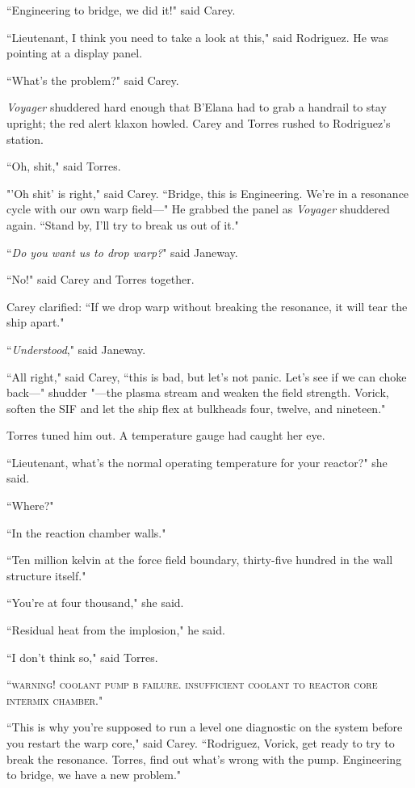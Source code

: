 \documentclass[twoside,letterpaper,12pt]{memoir}
\begin{document}
``Engineering to bridge, we did it!" said Carey.

``Lieutenant, I think you need to take a look at this," said Rodriguez. He was pointing at a display panel.

``What's the problem?" said Carey.

\textit{Voyager} shuddered hard enough that B'Elana had to grab a handrail to stay upright; the red alert klaxon howled. Carey and Torres rushed to Rodriguez's station.

``Oh, shit," said Torres.

"'Oh shit' is right," said Carey. ``Bridge, this is Engineering. We're in a resonance cycle with our own warp field---" He grabbed the panel as \textit{Voyager} shuddered again. ``Stand by, I'll try to break us out of it."

``\textit{Do you want us to drop warp?}" said Janeway.

``No!" said Carey and Torres together.

Carey clarified: ``If we drop warp without breaking the resonance, it will tear the ship apart."

``\textit{Understood}," said Janeway.

``All right," said Carey, ``this is bad, but let's not panic. Let's see if we can choke back---" shudder "---the plasma stream and weaken the field strength. Vorick, soften the SIF and let the ship flex at bulkheads four, twelve, and nineteen."

Torres tuned him out. A temperature gauge had caught her eye.

``Lieutenant, what's the normal operating temperature for your reactor?" she said.

``Where?"

``In the reaction chamber walls."

``Ten million kelvin at the force field boundary, thirty-five hundred in the wall structure itself."

``You're at four thousand," she said.

``Residual heat from the implosion," he said.

``I don't think so," said Torres.

``\textsc{warning! coolant pump b failure. insufficient coolant to reactor core intermix chamber}."

``This is why you're supposed to run a level one diagnostic on the system before you restart the warp core," said Carey. ``Rodriguez, Vorick, get ready to try to break the resonance. Torres, find out what's wrong with the pump. Engineering to bridge, we have a new problem."
\end{document}
